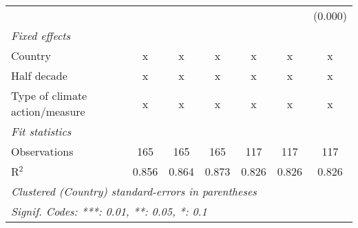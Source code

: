 \begin{tabular}{lcccccc}
                                                                         &              &                &                &                &                & (0.000)\\   
   \emph{Fixed effects}\\
   Country                                                               & x            & x              & x              & x              & x              & x\\  
   Half decade                                                           & x            & x              & x              & x              & x              & x\\  
   Type of climate action/measure                                        & x            & x              & x              & x              & x              & x\\  
   \midrule \emph{Fit statistics}\\
   Observations                                                          & 165          & 165            & 165            & 117            & 117            & 117\\  
   R$^2$                                                                 & 0.856        & 0.864          & 0.873          & 0.826          & 0.826          & 0.826\\  
   \midrule
   \multicolumn{7}{l}{\emph{Clustered (Country) standard-errors in parentheses}}\\
   \multicolumn{7}{l}{\emph{Signif. Codes: ***: 0.01, **: 0.05, *: 0.1}}\\
\end{tabular}
\par\endgroup


